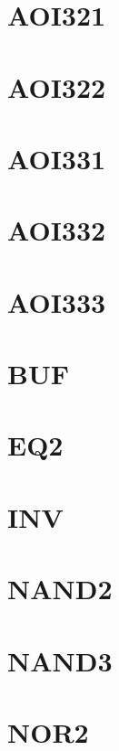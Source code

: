 \documentclass[10pt,a4paper,twoside]{report}
\begin{document}
\section{AOI321}

\clearpage

\section{AOI322}

\clearpage

\section{AOI331}

\clearpage

\section{AOI332}

\clearpage

\section{AOI333}

\clearpage

\section{BUF}

\clearpage

\section{EQ2}

\clearpage

\section{INV}

\clearpage

\section{NAND2}

\clearpage

\section{NAND3}

\clearpage

\section{NOR2}

\clearpage
\end{document}
